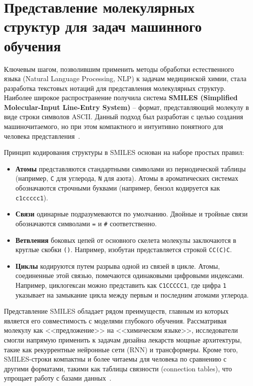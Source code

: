 
\section{Представление молекулярных структур для задач машинного обучения}
\label{sec:representation}

Ключевым шагом, позволившим применить методы обработки естественного языка (Natural Language Processing, NLP) к задачам медицинской химии, стала разработка текстовых нотаций для представления молекулярных структур. Наиболее широкое распространение получила система \textbf{SMILES (Simplified Molecular-Input Line-Entry System)} -- формат, представляющий молекулу в виде строки символов ASCII. Данный подход был разработан с целью создания машиночитаемого, но при этом компактного и интуитивно понятного для человека представления~\cite{wigh2022review}.

Принцип кодирования структуры в SMILES основан на наборе простых правил:
\begin{itemize}
	\item \textbf{Атомы} представляются стандартными символами из периодической таблицы (например, \texttt{C} для углерода, \texttt{N} для азота). Атомы в ароматических системах обозначаются строчными буквами (например, бензол кодируется как \texttt{c1ccccc1}).
	\item \textbf{Связи} одинарные подразумеваются по умолчанию. Двойные и тройные связи обозначаются символами \texttt{=} и \texttt{\#} соответственно.
	\item \textbf{Ветвления} боковых цепей от основного скелета молекулы заключаются в круглые скобки \texttt{()}. Например, изобутан представляется строкой \texttt{CC(C)C}.
	\item \textbf{Циклы} кодируются путем разрыва одной из связей в цикле. Атомы, соединенные этой связью, помечаются одинаковыми цифровыми индексами. Например, циклогексан можно представить как \texttt{C1CCCCC1}, где цифра \texttt{1} указывает на замыкание цикла между первым и последним атомами углерода.
\end{itemize}

Представление SMILES обладает рядом преимуществ, главным из которых является его совместимость с моделями глубокого обучения. Рассматривая молекулу как <<предложение>> на <<химическом языке>>, исследователи смогли напрямую применить к задачам дизайна лекарств мощные архитектуры, такие как рекуррентные нейронные сети (RNN) и трансформеры. Кроме того, SMILES-строки компактны и более читаемы для человека по сравнению с другими форматами, такими как таблицы связности (connection tables), что упрощает работу с базами данных~\cite{wigh2022review}.

